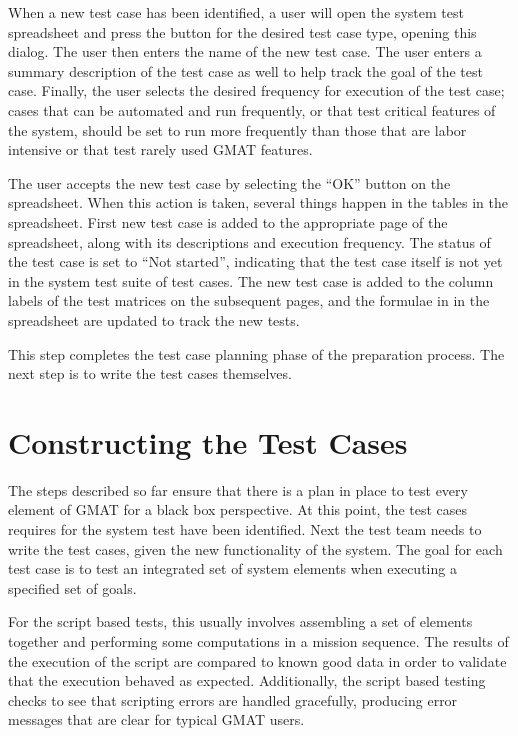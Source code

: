 When a new test case has been identified, a user will open the system test spreadsheet and press the
button for the desired test case type, opening this dialog.  The user then enters the name of the
new test case.  The user enters a summary description of the test case as well to help track the
goal of the test case.  Finally, the user selects the desired frequency for execution of the test
case; cases that can be automated and run frequently, or that test critical features of the system,
should be set to run more frequently than those that are labor intensive or that test rarely used
GMAT features.

The user accepts the new test case by selecting the ``OK'' button on the spreadsheet.  When this
action is taken, several things happen in the tables in the spreadsheet.  First new test case is
added to the appropriate page of the spreadsheet, along with its descriptions and execution
frequency.  The status of the test case is set to ``Not started'', indicating that the test case
itself is not yet in the system test suite of test cases.  The new test case is added to the column
labels of the test matrices on the subsequent pages, and the formulae in in the spreadsheet are
updated to track the new tests.

This step completes the test case planning phase of the preparation process.  The next step is to
write the test cases themselves.

\section{Constructing the Test Cases}

The steps described so far ensure that there is a plan in place to test every element of GMAT for a
black box perspective.  At this point, the test cases requires for the system test have been
identified.  Next the test team needs to write the test cases, given the new functionality of the
system.  The goal for each test case is to test an integrated set of system elements when executing
a specified set of goals.

For the script based tests, this usually involves assembling a set of elements together and
performing some computations in a mission sequence.  The results of the execution of the script are
compared to known good data in order to validate that the execution behaved as expected.
Additionally, the script based testing checks to see that scripting errors are handled gracefully,
producing error messages that are clear for typical GMAT users.

